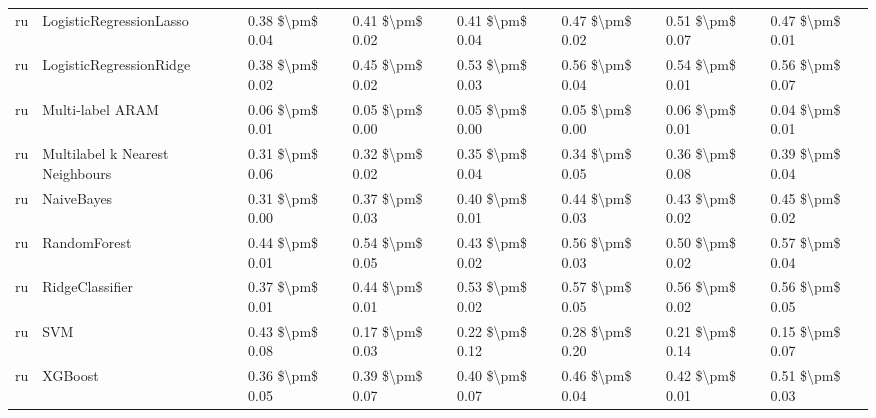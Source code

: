 \begin{tabular}{llllllll}
      ru &         LogisticRegressionLasso & 0.38 \$\textbackslash pm\$ 0.04 &           0.41 \$\textbackslash pm\$ 0.02 &       0.41 \$\textbackslash pm\$ 0.04 &        0.47 \$\textbackslash pm\$ 0.02 &                         0.51 \$\textbackslash pm\$ 0.07 &     0.47 \$\textbackslash pm\$ 0.01 \\
      ru &         LogisticRegressionRidge & 0.38 \$\textbackslash pm\$ 0.02 &           0.45 \$\textbackslash pm\$ 0.02 &       0.53 \$\textbackslash pm\$ 0.03 &        0.56 \$\textbackslash pm\$ 0.04 &                         0.54 \$\textbackslash pm\$ 0.01 &     0.56 \$\textbackslash pm\$ 0.07 \\
      ru &                Multi-label ARAM & 0.06 \$\textbackslash pm\$ 0.01 &           0.05 \$\textbackslash pm\$ 0.00 &       0.05 \$\textbackslash pm\$ 0.00 &        0.05 \$\textbackslash pm\$ 0.00 &                         0.06 \$\textbackslash pm\$ 0.01 &     0.04 \$\textbackslash pm\$ 0.01 \\
      ru & Multilabel k Nearest Neighbours & 0.31 \$\textbackslash pm\$ 0.06 &           0.32 \$\textbackslash pm\$ 0.02 &       0.35 \$\textbackslash pm\$ 0.04 &        0.34 \$\textbackslash pm\$ 0.05 &                         0.36 \$\textbackslash pm\$ 0.08 &     0.39 \$\textbackslash pm\$ 0.04 \\
      ru &                      NaiveBayes & 0.31 \$\textbackslash pm\$ 0.00 &           0.37 \$\textbackslash pm\$ 0.03 &       0.40 \$\textbackslash pm\$ 0.01 &        0.44 \$\textbackslash pm\$ 0.03 &                         0.43 \$\textbackslash pm\$ 0.02 &     0.45 \$\textbackslash pm\$ 0.02 \\
      ru &                    RandomForest & 0.44 \$\textbackslash pm\$ 0.01 &           0.54 \$\textbackslash pm\$ 0.05 &       0.43 \$\textbackslash pm\$ 0.02 &        0.56 \$\textbackslash pm\$ 0.03 &                         0.50 \$\textbackslash pm\$ 0.02 &     0.57 \$\textbackslash pm\$ 0.04 \\
      ru &                 RidgeClassifier & 0.37 \$\textbackslash pm\$ 0.01 &           0.44 \$\textbackslash pm\$ 0.01 &       0.53 \$\textbackslash pm\$ 0.02 &        0.57 \$\textbackslash pm\$ 0.05 &                         0.56 \$\textbackslash pm\$ 0.02 &     0.56 \$\textbackslash pm\$ 0.05 \\
      ru &                             SVM & 0.43 \$\textbackslash pm\$ 0.08 &           0.17 \$\textbackslash pm\$ 0.03 &       0.22 \$\textbackslash pm\$ 0.12 &        0.28 \$\textbackslash pm\$ 0.20 &                         0.21 \$\textbackslash pm\$ 0.14 &     0.15 \$\textbackslash pm\$ 0.07 \\
      ru &                         XGBoost & 0.36 \$\textbackslash pm\$ 0.05 &           0.39 \$\textbackslash pm\$ 0.07 &       0.40 \$\textbackslash pm\$ 0.07 &        0.46 \$\textbackslash pm\$ 0.04 &                         0.42 \$\textbackslash pm\$ 0.01 &     0.51 \$\textbackslash pm\$ 0.03 \\
\bottomrule
\end{tabular}
